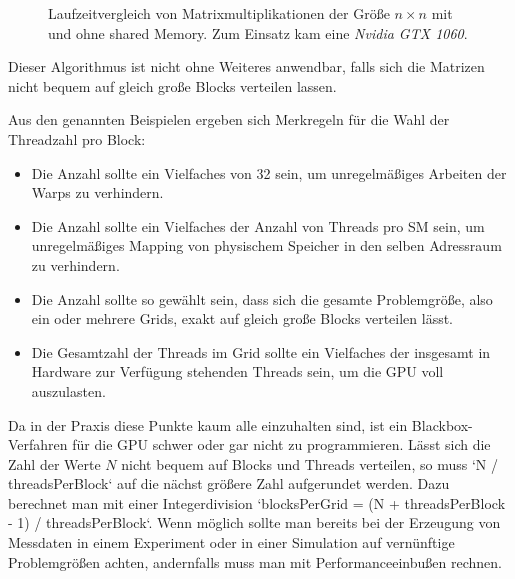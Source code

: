         \begin{figure}[h]
  		\centering
  		\caption[Matrixmultiplikation shared Memory]{Laufzeitvergleich von Matrixmultiplikationen der Größe $n\times n$ mit und ohne shared Memory. Zum Einsatz kam eine \textit{Nvidia GTX 1060}.}
  		\label{fig3:matmul}
		\end{figure}
        
        Dieser Algorithmus ist nicht ohne Weiteres anwendbar, falls sich die Matrizen nicht bequem auf gleich große \Glspl{Block} verteilen lassen.
        
        Aus den genannten Beispielen ergeben sich Merkregeln für die Wahl der \Gls{Thread}zahl pro \Gls{Block}:
        \begin{itemize}
            	\item Die Anzahl sollte ein Vielfaches von 32 sein, um unregelmäßiges Arbeiten der \Glspl{Warp} zu verhindern.
            	\item Die Anzahl sollte ein Vielfaches der Anzahl von \Glspl{Thread} pro \Gls{SM} sein, um unregelmäßiges Mapping von physischem Speicher in den selben Adressraum zu verhindern.
            	\item Die Anzahl sollte so gewählt sein, dass sich die gesamte Problemgröße, also ein oder mehrere \Glspl{Grid}, exakt auf gleich große \Glspl{Block} verteilen lässt.
            	\item Die Gesamtzahl der \Glspl{Thread} im \Gls{Grid} sollte ein Vielfaches der insgesamt in Hardware zur Verfügung stehenden \Glspl{Thread} sein, um die GPU voll auszulasten.
        \end{itemize}
        
        Da in der Praxis diese Punkte kaum alle einzuhalten sind, ist ein Blackbox-Verfahren für die GPU schwer oder gar nicht zu programmieren. Lässt sich die Zahl der Werte $N$ nicht bequem auf \Glspl{Block} und \Glspl{Thread} verteilen, so muss \li`N / threadsPerBlock` auf die nächst größere Zahl aufgerundet werden. Dazu berechnet man mit einer Integerdivision \li`blocksPerGrid = (N + threadsPerBlock - 1) / threadsPerBlock`. Wenn möglich sollte man bereits bei der Erzeugung von Messdaten in einem Experiment oder in einer Simulation auf vernünftige Problemgrößen achten, andernfalls muss man mit \Gls{Performance}einbußen rechnen.
        				
